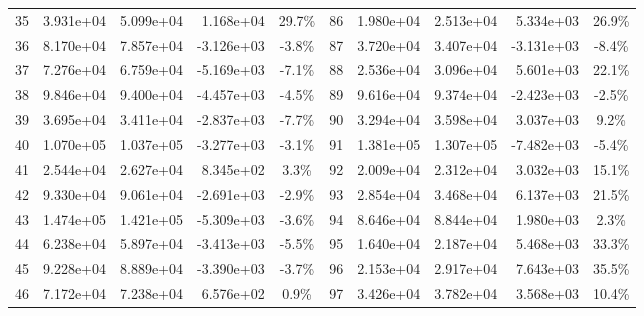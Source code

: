 \begin{table}
\begin{tabular}{|c|r|r|r|c||c|r|r|r|c|}
        35          & 3.931e+04        & 5.099e+04      & 1.168e+04       & 29.7\%               & 86          & 1.980e+04        & 2.513e+04      & 5.334e+03       & 26.9\%               \\
        36          & 8.170e+04        & 7.857e+04      & -3.126e+03      & -3.8\%               & 87          & 3.720e+04        & 3.407e+04      & -3.131e+03      & -8.4\%               \\
        37          & 7.276e+04        & 6.759e+04      & -5.169e+03      & -7.1\%               & 88          & 2.536e+04        & 3.096e+04      & 5.601e+03       & 22.1\%               \\
        38          & 9.846e+04        & 9.400e+04      & -4.457e+03      & -4.5\%               & 89          & 9.616e+04        & 9.374e+04      & -2.423e+03      & -2.5\%               \\
        39          & 3.695e+04        & 3.411e+04      & -2.837e+03      & -7.7\%               & 90          & 3.294e+04        & 3.598e+04      & 3.037e+03       & 9.2\%                \\
        40          & 1.070e+05        & 1.037e+05      & -3.277e+03      & -3.1\%               & 91          & 1.381e+05        & 1.307e+05      & -7.482e+03      & -5.4\%               \\
        41          & 2.544e+04        & 2.627e+04      & 8.345e+02       & 3.3\%                & 92          & 2.009e+04        & 2.312e+04      & 3.032e+03       & 15.1\%               \\
        42          & 9.330e+04        & 9.061e+04      & -2.691e+03      & -2.9\%               & 93          & 2.854e+04        & 3.468e+04      & 6.137e+03       & 21.5\%               \\
        43          & 1.474e+05        & 1.421e+05      & -5.309e+03      & -3.6\%               & 94          & 8.646e+04        & 8.844e+04      & 1.980e+03       & 2.3\%                \\
        44          & 6.238e+04        & 5.897e+04      & -3.413e+03      & -5.5\%               & 95          & 1.640e+04        & 2.187e+04      & 5.468e+03       & 33.3\%               \\
        45          & 9.228e+04        & 8.889e+04      & -3.390e+03      & -3.7\%               & 96          & 2.153e+04        & 2.917e+04      & 7.643e+03       & 35.5\%               \\
        46          & 7.172e+04        & 7.238e+04      & 6.576e+02       & 0.9\%                & 97          & 3.426e+04        & 3.782e+04      & 3.568e+03       & 10.4\%               \\

\end{tabular}
\end{table}
